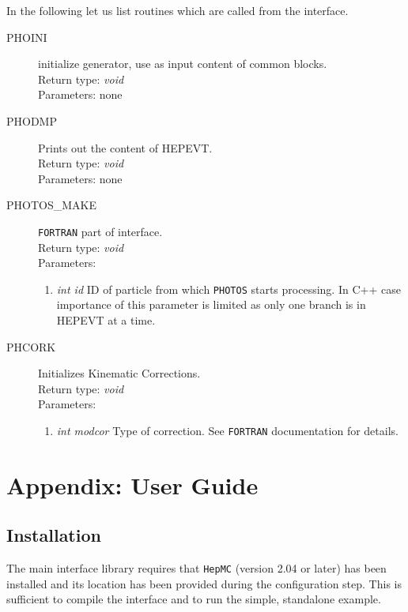 \documentclass[]{Photos_interface_design}
\begin{document}
In the following let us list routines which are called from the interface.

\begin{description}
\item[PHOINI] initialize generator, use as input content of common blocks. \\
  Return type: \textit{void} \\
  Parameters: none
\end{description}

\begin{description}
\item[PHODMP] Prints out the content of HEPEVT. \\
  Return type: \textit{void} \\
  Parameters: none
\end{description}

\begin{description}
\item[PHOTOS\_MAKE] {\tt FORTRAN} part of interface. \\
  Return type: \textit{void} \\
  Parameters:
  \begin{enumerate}
    \item \textit {int id} ID of particle from which {\tt PHOTOS} starts processing. In C++ case importance of this parameter is limited as only one branch is in HEPEVT at a time.
  \end{enumerate}
\end{description}

\begin{description}
\item[PHCORK] Initializes Kinematic Corrections. \\
  Return type: \textit{void} \\
  Parameters:
  \begin{enumerate}
    \item \textit {int modcor} Type of correction. See {\tt FORTRAN} documentation for details.
  \end{enumerate}
\end{description}

\section{Appendix: User Guide}
\label{sec:User Guide}

\subsection{Installation}
\label{sec:Installation}
The main interface library requires that {\tt HepMC} \cite{Dobbs:2001ck} (version 2.04 or later)  has been installed
and its location has been provided during the configuration step. This is sufficient to compile the interface and to run the simple, standalone example.
\end{document}
